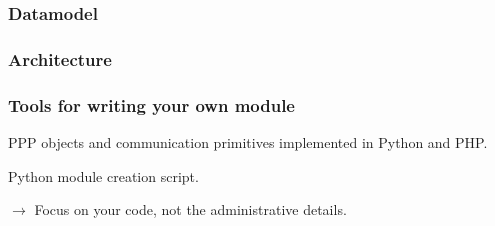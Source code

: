 \begin{frame}[fragile]
    \frametitle{Datamodel}
\end{frame}

\begin{frame}[fragile]
    \frametitle{Architecture}
    \begin{figure}
        \resizebox{.9\linewidth}{!}{
            
        }
    \end{figure}
\end{frame}

\begin{frame}[fragile]
    \frametitle{Tools for writing your own module}
    PPP objects and communication primitives implemented in Python and PHP.

    Python module creation script.

    $\rightarrow$ Focus on your code, not the administrative details.
\end{frame}
